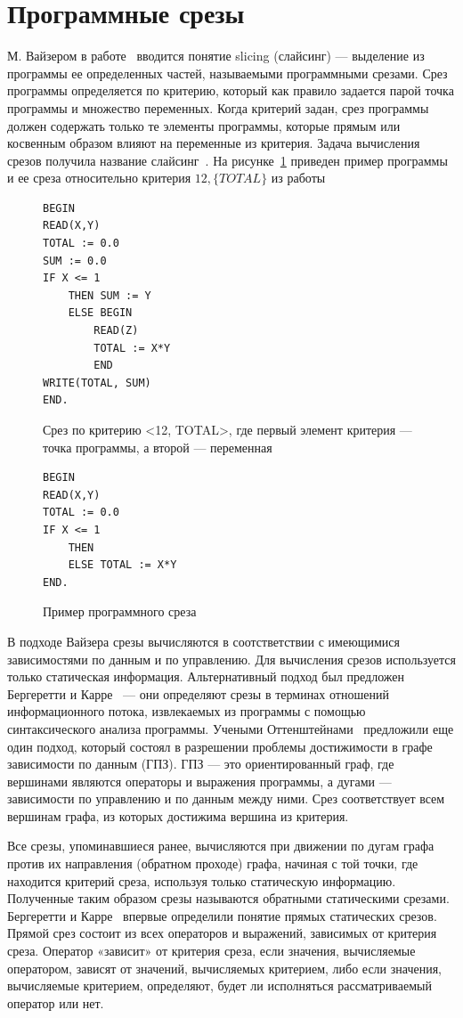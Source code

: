 \section{Программные срезы}
М. Вайзером в работе~\cite{weiser1981program} вводится понятие slicing (слайсинг) --- выделение из программы ее определенных частей, называемыми программными срезами. Срез программы определяется по критерию, который как правило задается парой точка программы и множество переменных. Когда критерий задан, срез программы должен содержать только те элементы программы, которые прямым или косвенным образом влияют на переменные из критерия. Задача вычисления срезов получила название слайсинг~\cite{2002slicing}. На рисунке~\ref{ex:slice} приведен пример программы и ее среза относительно критерия \(12, \{TOTAL\}\) из работы~\cite{weiser1981program}
\begin{figure}[]
\begin{lstlisting}
BEGIN
READ(X,Y)
TOTAL := 0.0
SUM := 0.0
IF X <= 1
	THEN SUM := Y
	ELSE BEGIN
		READ(Z)
		TOTAL := X*Y
		END
WRITE(TOTAL, SUM)
END.
\end{lstlisting}
Срез по критерию <12, {TOTAL}>, где первый элемент критерия --- точка программы, а второй --- переменная
\begin{lstlisting}
BEGIN
READ(X,Y)
TOTAL := 0.0
IF X <= 1
	THEN 
	ELSE TOTAL := X*Y
END.
\end{lstlisting}
\caption{Пример программного среза}
\label{ex:slice}
\end{figure}
В подходе Вайзера срезы вычисляются в соотстветствии с имеющимися зависимостями по данным и по управлению. Для вычисления срезов используется только статическая информация. Альтернативный подход был предложен Бергеретти и Карре~\cite{bergeretti1985information} --- они определяют срезы в терминах отношений информационного потока, извлекаемых из программы с помощью синтаксического анализа программы. Учеными Оттенштейнами~\cite{ottenstein1984program} предложили еще один подход, который состоял в разрешении проблемы достижимости в графе зависимости по данным (ГПЗ). ГПЗ --- это ориентированный граф, где вершинами являются операторы и выражения программы, а дугами --- зависимости по управлению и по данным между ними. Срез соответствует всем вершинам графа, из которых достижима вершина из критерия.

Все срезы, упоминавшиеся ранее, вычисляются при движении по дугам графа против их направления (обратном проходе) графа, начиная с той точки, где находится критерий среза, используя только статическую информацию. Полученные таким образом срезы называются обратными статическими срезами. Бергеретти и Карре~\cite{bergeretti1985information} впервые определили понятие прямых статических срезов. Прямой срез состоит из всех операторов и выражений, зависимых от критерия среза. Оператор «зависит» от критерия среза, если значения, вычисляемые оператором, зависят от значений, вычисляемых критерием, либо если значения, вычисляемые критерием, определяют, будет ли исполняться рассматриваемый оператор или нет. 

